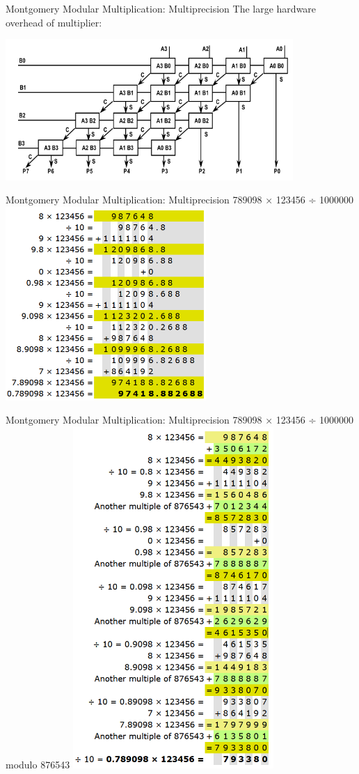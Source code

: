 \documentclass{beamer}
\begin{document}
\begin{frame}{Montgomery Modular Multiplication: Multiprecision}
	The large hardware overhead of multiplier:


	\includegraphics[width=4.3in]{fig/mul.png}
\end{frame}

\begin{frame}{Montgomery Modular Multiplication: Multiprecision}
	789098 × 123456 ÷ 1000000
	\includegraphics[width=3in]{fig/mont1.png}
\end{frame}

\begin{frame}{Montgomery Modular Multiplication: Multiprecision}
	789098 × 123456 ÷ 1000000 modulo 876543
	\includegraphics[width=3in]{fig/mont2.png}
\end{frame}
\end{document}
